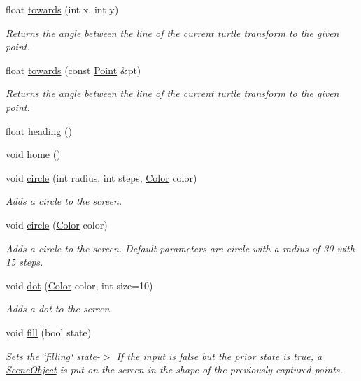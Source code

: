 \begin{DoxyCompactItemize}
float \hyperlink{classcturtle_1_1Turtle_a1ac8961a3d5d3044b3f3f011778b51bf}{towards} (int x, int y)
\begin{DoxyCompactList}\small\item\em Returns the angle between the line of the current turtle transform to the given point. \end{DoxyCompactList}\item 
float \hyperlink{classcturtle_1_1Turtle_ab625cf304b44417c7d3cacd65b372d37}{towards} (const \hyperlink{structcturtle_1_1ivec2}{Point} \&pt)
\begin{DoxyCompactList}\small\item\em Returns the angle between the line of the current turtle transform to the given point. \end{DoxyCompactList}\item 
float \hyperlink{classcturtle_1_1Turtle_a5c90aa6dea03e88f202dcadc4ff77354}{heading} ()
\item 
void \hyperlink{classcturtle_1_1Turtle_ab6558ff8b547bfb54a68c55259f7bb32}{home} ()
\item 
void \hyperlink{classcturtle_1_1Turtle_a6ce4e8065581887d006f420d0e93967e}{circle} (int radius, int steps, \hyperlink{classcturtle_1_1Color}{Color} color)
\begin{DoxyCompactList}\small\item\em Adds a circle to the screen. \end{DoxyCompactList}\item 
void \hyperlink{classcturtle_1_1Turtle_a1f945648941a632ed33d28e9c51b8207}{circle} (\hyperlink{classcturtle_1_1Color}{Color} color)
\begin{DoxyCompactList}\small\item\em Adds a circle to the screen. Default parameters are circle with a radius of 30 with 15 steps. \end{DoxyCompactList}\item 
void \hyperlink{classcturtle_1_1Turtle_af33a02ec769c35671204abcc33050b0f}{dot} (\hyperlink{classcturtle_1_1Color}{Color} color, int size=10)
\begin{DoxyCompactList}\small\item\em Adds a dot to the screen. \end{DoxyCompactList}\item 
void \hyperlink{classcturtle_1_1Turtle_a7026fc9ad563b91b5a7a168718e91d6f}{fill} (bool state)
\begin{DoxyCompactList}\small\item\em Sets the \char`\"{}filling\char`\"{} state-\/$>$ If the input is false but the prior state is true, a \hyperlink{structcturtle_1_1SceneObject}{Scene\+Object} is put on the screen in the shape of the previously captured points. \end{DoxyCompactList}\item 

\end{DoxyCompactItemize}

